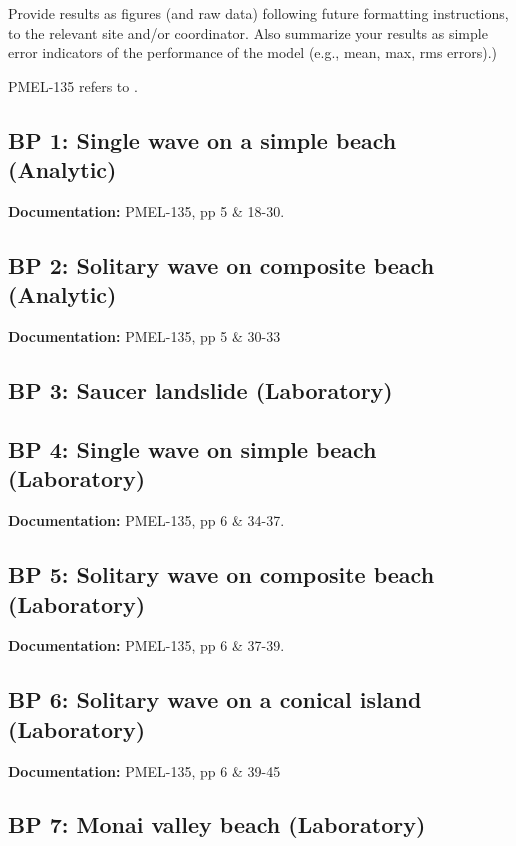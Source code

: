 \documentclass[11pt]{article}
\begin{document}
Provide results as figures (and raw data) following future formatting
instructions, to the relevant site and/or coordinator. Also summarize your
results as simple error indicators of the performance of the model (e.g.,
mean, max, rms errors).)

PMEL-135 refers to \cite{SynolakisBernard:pmel135}.

\subsection{BP 1:
  Single wave on a simple beach (Analytic)}

{\bf Documentation:}  PMEL-135, pp 5 \& 18-30.

\subsection{BP 2:
 Solitary wave on composite beach (Analytic)}

{\bf Documentation:}  PMEL-135, pp 5 \& 30-33

\subsection{BP 3:
 Saucer landslide (Laboratory)}

\subsection{BP 4:
 Single wave on simple beach (Laboratory)}

{\bf Documentation:}  PMEL-135, pp 6 \& 34-37.

\subsection{BP 5:
 Solitary wave on composite beach (Laboratory) }

{\bf Documentation:}  PMEL-135, pp 6 \& 37-39.

\subsection{BP 6:
 Solitary wave on a conical island (Laboratory)}

{\bf Documentation:}  PMEL-135, pp 6 \& 39-45

\newpage
\subsection{BP 7:
 Monai valley beach (Laboratory)}
\end{document}
